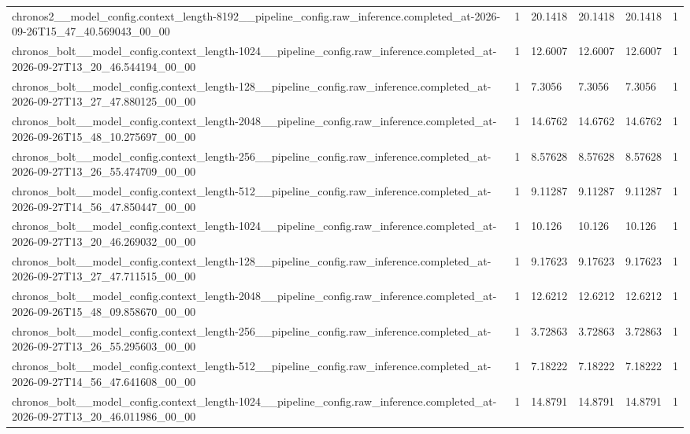 \begin{tabular}{llllll}
chronos2\_\_model\_config.context\_length-8192\_\_pipeline\_config.raw\_inference.completed\_at-2026-09-26T15\_47\_40.569043\_00\_00 & 1 & 20.1418 & 20.1418 & 20.1418 & 1 \\
chronos\_bolt\_\_model\_config.context\_length-1024\_\_pipeline\_config.raw\_inference.completed\_at-2026-09-27T13\_20\_46.544194\_00\_00 & 1 & 12.6007 & 12.6007 & 12.6007 & 1 \\
chronos\_bolt\_\_model\_config.context\_length-128\_\_pipeline\_config.raw\_inference.completed\_at-2026-09-27T13\_27\_47.880125\_00\_00 & 1 & 7.3056 & 7.3056 & 7.3056 & 1 \\
chronos\_bolt\_\_model\_config.context\_length-2048\_\_pipeline\_config.raw\_inference.completed\_at-2026-09-26T15\_48\_10.275697\_00\_00 & 1 & 14.6762 & 14.6762 & 14.6762 & 1 \\
chronos\_bolt\_\_model\_config.context\_length-256\_\_pipeline\_config.raw\_inference.completed\_at-2026-09-27T13\_26\_55.474709\_00\_00 & 1 & 8.57628 & 8.57628 & 8.57628 & 1 \\
chronos\_bolt\_\_model\_config.context\_length-512\_\_pipeline\_config.raw\_inference.completed\_at-2026-09-27T14\_56\_47.850447\_00\_00 & 1 & 9.11287 & 9.11287 & 9.11287 & 1 \\
chronos\_bolt\_\_model\_config.context\_length-1024\_\_pipeline\_config.raw\_inference.completed\_at-2026-09-27T13\_20\_46.269032\_00\_00 & 1 & 10.126 & 10.126 & 10.126 & 1 \\
chronos\_bolt\_\_model\_config.context\_length-128\_\_pipeline\_config.raw\_inference.completed\_at-2026-09-27T13\_27\_47.711515\_00\_00 & 1 & 9.17623 & 9.17623 & 9.17623 & 1 \\
chronos\_bolt\_\_model\_config.context\_length-2048\_\_pipeline\_config.raw\_inference.completed\_at-2026-09-26T15\_48\_09.858670\_00\_00 & 1 & 12.6212 & 12.6212 & 12.6212 & 1 \\
chronos\_bolt\_\_model\_config.context\_length-256\_\_pipeline\_config.raw\_inference.completed\_at-2026-09-27T13\_26\_55.295603\_00\_00 & 1 & 3.72863 & 3.72863 & 3.72863 & 1 \\
chronos\_bolt\_\_model\_config.context\_length-512\_\_pipeline\_config.raw\_inference.completed\_at-2026-09-27T14\_56\_47.641608\_00\_00 & 1 & 7.18222 & 7.18222 & 7.18222 & 1 \\
chronos\_bolt\_\_model\_config.context\_length-1024\_\_pipeline\_config.raw\_inference.completed\_at-2026-09-27T13\_20\_46.011986\_00\_00 & 1 & 14.8791 & 14.8791 & 14.8791 & 1 \\

\end{tabular}

